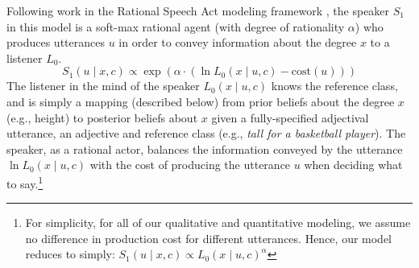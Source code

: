 \documentclass[doc, floatsintext]{apa6}
\newcommand{\ndg}[1]{\textcolor{Green}{[ndg: #1]}}
\begin{document}
Following work in the Rational Speech Act modeling framework \cite{Frank2012, Goodman2016, scontras2017probabilistic}, the speaker $S_1$ in this model is a soft-max rational agent (with degree of rationality $\alpha$) who produces utterances $u$ in order to convey information about the degree $x$ to a listener $L_0$.
%
\begin{equation}
S_1(u \mid x, c) \propto \exp{(\alpha \cdot (\ln L_{0}(x \mid u, c) - \text{cost}(u) ))}\label{eq:S1}
\end{equation}
%
%
%
%
%
%
%
The listener in the mind of the speaker $L_{0}(x \mid u, c)$ knows the reference class, and is simply a mapping (described below) from prior beliefs about the degree $x$ (e.g., height) to posterior beliefs about $x$ given a fully-specified adjectival utterance, an adjective and reference class (e.g., \emph{tall for a basketball player}).
The speaker, as a rational actor, balances the information conveyed by the utterance $\ln L_{0}(x \mid u, c)$ with the cost of producing the utterance $u$ when deciding what to say.\footnote{For simplicity, for all of our qualitative and quantitative modeling, we assume no difference in production cost for different utterances. Hence, our model reduces to simply: $S_1(u \mid x, c) \propto L_{0}(x \mid u, c)^{ \alpha}$}
\end{document}
